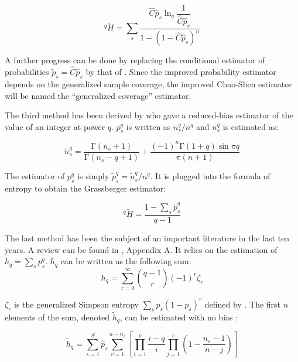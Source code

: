 \documentclass[fleqn,10pt]{latex/stylish_article} %
\begin{document}
\begin{equation}
  ^{q}{\tilde{H}} =\sum_{s}{\frac{\hat{C}{\hat{p}}_s\ln_q\dfrac{1}{\hat{C}{\hat{p}}_s}}{1-{\left(1-\hat{C}{\hat{p}}_s\right)}^n}}
\end{equation}

A further progress can be done by replacing the conditional estimator of probabilities \(\tilde{p}_s = \hat{C} \hat{p}_s\) by that of \citet{Chao2014c}.
Since the improved probability estimator depends on the generalized sample coverage, the improved Chao-Shen estimator will be named the ``generalized coverage'' estimator.

The third method has been derived by \citet{Grassberger1988} who gave a reduced-bias estimator of the value of an integer at power \(q\).
\({p_s^q}\) is written as \(n_s^q/n^q\) and \(n_s^q\) is estimated \citep{Marcon2014a} as:

\begin{equation}
  \tilde{n}^{q}_{s}
  = \frac{\mathrm{\Gamma}\left(n_s +1\right)}{\mathrm{\Gamma}\left(n_s -q+1\right)}
  + \frac{{\left(-1\right)}^n \mathrm{\Gamma}\left(1+q\right)\sin{\pi q}}{\pi\left(n+1\right)}
\end{equation}

The estimator of \({p_s^q}\) is simply \(\tilde{p}^{q}_{s} = \tilde{n}^{q}_{s}/n^q\).
It is plugged into the formula of entropy to obtain the Grassberger estimator:

\begin{equation}
  ^{q}{\tilde{H}}
  = \frac{1-\sum_{s}{\tilde{p}^{q}_{s}}}{q-1}
  \label{eq:Grassberger}
\end{equation}

The last method has been the subject of an important literature in the last ten years.
A review can be found in \citet{Chao2013}, Appendix A.
It relies on the estimation of \(h_q=\sum_{s}{p_s^q}\).
\(h_q\) can be written as the following sum:
\begin{equation}
    h_q = \sum_{r=0}^{\infty}{\binom{q-1}{r} \left( -1\right)^r \zeta_r}
  \label{eq:hq}
\end{equation}

\(\zeta_r\) is the generalized Simpson entropy \(\sum_{s}{p_s(1-p_s)^r}\) defined by \citet{Zhang2010}.
The first \(n\) elements of the sum, denoted \(\tilde{h}_{q}\), can be estimated with no bias \citep{Zhang2014}:

\begin{equation}
  \tilde{h}_{q} = \sum_{s=1}^{S}{{\hat{p}}_{s}
      \sum_{v=1}^{n-n_s}{\left[ 
        \prod_{i=1}^{v}{\frac{i-q}{i} \prod_{j=1}^{v}{\left( 1-\frac{n_s-1}{n-j}\right) }} 
        \right] }}
\end{equation}
\end{document}

